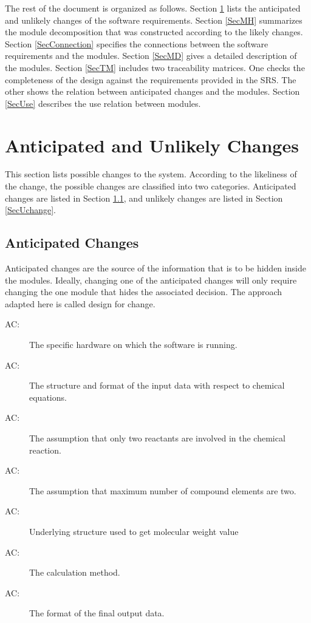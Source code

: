 \documentclass[12pt, titlepage]{article}
\newcounter{acnum}
\newcommand{\actheacnum}{AC\theacnum}
\begin{document}
The rest of the document is organized as follows. Section
\ref{SecChange} lists the anticipated and unlikely changes of the software
requirements. Section \ref{SecMH} summarizes the module decomposition that
was constructed according to the likely changes. Section \ref{SecConnection}
specifies the connections between the software requirements and the
modules. Section \ref{SecMD} gives a detailed description of the
modules. Section \ref{SecTM} includes two traceability matrices. One checks
the completeness of the design against the requirements provided in the SRS. The
other shows the relation between anticipated changes and the modules. Section
\ref{SecUse} describes the use relation between modules.

\section{Anticipated and Unlikely Changes} \label{SecChange}

This section lists possible changes to the system. According to the likeliness
of the change, the possible changes are classified into two
categories. Anticipated changes are listed in Section \ref{SecAchange}, and
unlikely changes are listed in Section \ref{SecUchange}.

\subsection{Anticipated Changes} \label{SecAchange}

Anticipated changes are the source of the information that is to be hidden
inside the modules. Ideally, changing one of the anticipated changes will only
require changing the one module that hides the associated decision. The approach
adapted here is called design for
change.

\begin{description}
\item[ \actheacnum \label{acHardware}:] The specific hardware on which the software is running.
\item[ \actheacnum \label{acInput}:] The structure and format of the input data with respect to chemical equations.
\item[ \actheacnum \label{reactants}:] The assumption that only two reactants are involved in the chemical reaction.
\item[ \actheacnum \label{compound}:] The assumption that maximum number of compound elements are two.
\item[ \actheacnum \label{atomic mass}:] Underlying structure used to get molecular weight value 
\item[ \actheacnum \label{calculation}:] The calculation method.
\item[ \actheacnum \label{output}:] The format of the final output data.

\end{description}
\end{document}
